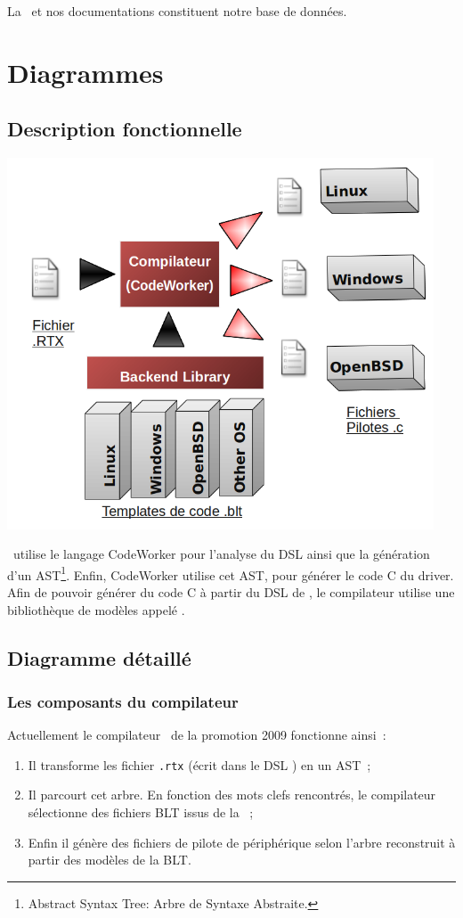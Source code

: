 \documentclass{rtxreport}
\begin{document}
La \BL\ et nos documentations constituent notre base de données.

\chapter{Diagrammes}

\section{Description fonctionnelle}

\includegraphics[width=0.95\textwidth]{diagramme_general}

\rtx\ utilise le langage CodeWorker\cite{CodeWorker} pour l'analyse du DSL ainsi
que la génération d'un AST\footnote{Abstract Syntax Tree: Arbre de Syntaxe
Abstraite.}. Enfin, CodeWorker utilise cet AST, pour générer le code C du
driver. Afin de pouvoir générer du code C à partir du DSL de \rtx, le
compilateur utilise une bibliothèque de modèles appelé \BL.

\section{Diagramme détaillé}

\subsection{Les composants du compilateur}

Actuellement le compilateur \rtx\ de la promotion 2009 fonctionne ainsi~:
\begin{enumerate}
\item Il transforme les fichier \texttt{.rtx} (écrit dans le DSL \rtx) en un AST~;
\item Il parcourt cet arbre. En fonction des mots clefs rencontrés, le
compilateur sélectionne des fichiers BLT issus de la \BL~;
\item Enfin il génère des fichiers de pilote de périphérique selon l'arbre
reconstruit à partir des modèles de la BLT.
\end{enumerate}
\end{document}
